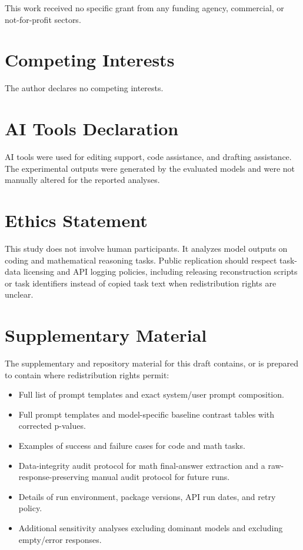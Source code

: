 \documentclass{llncs}
\providecommand{\tightlist}{%
  \setlength{\itemsep}{0pt}\setlength{\parskip}{0pt}}
\begin{document}
This work received no specific grant from any funding agency,
commercial, or not-for-profit sectors.

\section{Competing Interests}\label{competing-interests}

The author declares no competing interests.

\section{AI Tools Declaration}\label{ai-tools-declaration}

AI tools were used for editing support, code assistance, and drafting
assistance. The experimental outputs were generated by the evaluated
models and were not manually altered for the reported analyses.

\section{Ethics Statement}\label{ethics-statement}

This study does not involve human participants. It analyzes model
outputs on coding and mathematical reasoning tasks. Public replication
should respect task-data licensing and API logging policies, including
releasing reconstruction scripts or task identifiers instead of copied
task text when redistribution rights are unclear.

\section{Supplementary Material}\label{supplementary-material}

The supplementary and repository material for this draft contains, or is
prepared to contain where redistribution rights permit:

\begin{itemize}
\tightlist
\item
  Full list of prompt templates and exact system/user prompt
  composition.
\item
  Full prompt templates and model-specific baseline contrast tables with
  corrected p-values.
\item
  Examples of success and failure cases for code and math tasks.
\item
  Data-integrity audit protocol for math final-answer extraction and a
  raw-response-preserving manual audit protocol for future runs.
\item
  Details of run environment, package versions, API run dates, and retry
  policy.
\item
  Additional sensitivity analyses excluding dominant models and
  excluding empty/error responses.
\end{itemize}


\end{document}
